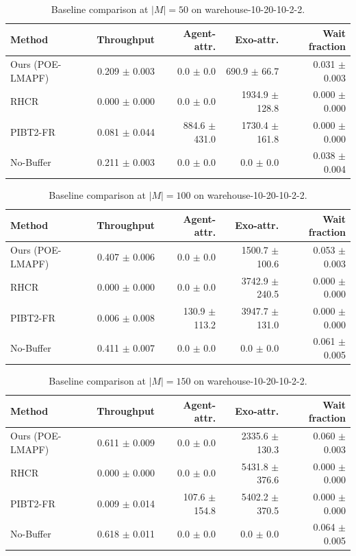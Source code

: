 \begin{table}[t]
\centering
\small
\begin{tabular}{lrrrr}
\toprule
Method & Throughput & Agent-attr. & Exo-attr. & Wait fraction \\
\midrule
Ours (POE-LMAPF) & 0.209 $\pm$ 0.003 & 0.0 $\pm$ 0.0 & 690.9 $\pm$ 66.7 & 0.031 $\pm$ 0.003 \\
RHCR & 0.000 $\pm$ 0.000 & 0.0 $\pm$ 0.0 & 1934.9 $\pm$ 128.8 & 0.000 $\pm$ 0.000 \\
PIBT2-FR & 0.081 $\pm$ 0.044 & 884.6 $\pm$ 431.0 & 1730.4 $\pm$ 161.8 & 0.000 $\pm$ 0.000 \\
No-Buffer & 0.211 $\pm$ 0.003 & 0.0 $\pm$ 0.0 & 0.0 $\pm$ 0.0 & 0.038 $\pm$ 0.004 \\
\bottomrule
\end{tabular}
\caption{Baseline comparison at $|M|=50$ on warehouse-10-20-10-2-2.}
\label{tab:baselines_50}
\end{table}

\begin{table}[t]
\centering
\small
\begin{tabular}{lrrrr}
\toprule
Method & Throughput & Agent-attr. & Exo-attr. & Wait fraction \\
\midrule
Ours (POE-LMAPF) & 0.407 $\pm$ 0.006 & 0.0 $\pm$ 0.0 & 1500.7 $\pm$ 100.6 & 0.053 $\pm$ 0.003 \\
RHCR & 0.000 $\pm$ 0.000 & 0.0 $\pm$ 0.0 & 3742.9 $\pm$ 240.5 & 0.000 $\pm$ 0.000 \\
PIBT2-FR & 0.006 $\pm$ 0.008 & 130.9 $\pm$ 113.2 & 3947.7 $\pm$ 131.0 & 0.000 $\pm$ 0.000 \\
No-Buffer & 0.411 $\pm$ 0.007 & 0.0 $\pm$ 0.0 & 0.0 $\pm$ 0.0 & 0.061 $\pm$ 0.005 \\
\bottomrule
\end{tabular}
\caption{Baseline comparison at $|M|=100$ on warehouse-10-20-10-2-2.}
\label{tab:baselines_100}
\end{table}

\begin{table}[t]
\centering
\small
\begin{tabular}{lrrrr}
\toprule
Method & Throughput & Agent-attr. & Exo-attr. & Wait fraction \\
\midrule
Ours (POE-LMAPF) & 0.611 $\pm$ 0.009 & 0.0 $\pm$ 0.0 & 2335.6 $\pm$ 130.3 & 0.060 $\pm$ 0.003 \\
RHCR & 0.000 $\pm$ 0.000 & 0.0 $\pm$ 0.0 & 5431.8 $\pm$ 376.6 & 0.000 $\pm$ 0.000 \\
PIBT2-FR & 0.009 $\pm$ 0.014 & 107.6 $\pm$ 154.8 & 5402.2 $\pm$ 370.5 & 0.000 $\pm$ 0.000 \\
No-Buffer & 0.618 $\pm$ 0.011 & 0.0 $\pm$ 0.0 & 0.0 $\pm$ 0.0 & 0.064 $\pm$ 0.005 \\
\bottomrule
\end{tabular}
\caption{Baseline comparison at $|M|=150$ on warehouse-10-20-10-2-2.}
\label{tab:baselines_150}
\end{table}

